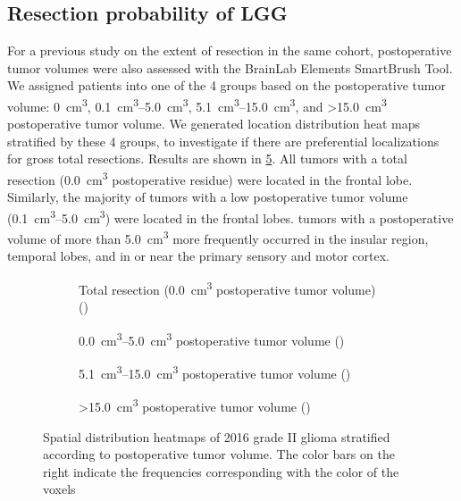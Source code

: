 \subsection{Resection probability of \acrshort{LGG}}
For a previous study on the extent of resection in the same cohort, postoperative \gls{tumor} volumes were also assessed with the BrainLab Elements SmartBrush Tool.
We assigned patients into one of the 4 groups based on the postoperative \gls{tumor} volume:  \SI{0}{\cubic\centi\metre}, \SIrange{0.1}{5.0}{\cubic\centi\metre}, \SIrange{5.1}{15.0}{\cubic\centi\metre}, and \SI{>15.0}{\cubic\centi\metre} postoperative \gls{tumor} volume.
We generated location distribution heat maps stratified by these 4 groups, to investigate if there are preferential localizations for gross total resections.
Results are shown in \cref{fig:LGG_location_postop_volume}.
All \glspl{tumor} with a total resection (\SI{0.0}{\cubic\centi\metre} postoperative residue) were located in the frontal lobe.
Similarly, the majority of \glspl{tumor} with a low postoperative \gls{tumor} volume (\SIrange{0.1}{5.0}{\cubic\centi\metre}) were located in the frontal lobes.
\Glspl{tumor} with a postoperative volume of more than \SI{5.0}{\cubic\centi\metre} more frequently occurred in the insular region, temporal lobes, and in or near the primary sensory and motor cortex.

\begin{figure}[htbp]
\centering
\begin{subfigure}[b]{\textwidth}
    \caption{Total resection (\SI{0.0}{\cubic\centi\metre} postoperative \gls{tumor} volume) ()}\label{fig:LGG_location_heatmap_postop_0}
\end{subfigure}
\begin{subfigure}[b]{\textwidth}
    \caption{\SIrange{0.0}{5.0}{\cubic\centi\metre} postoperative \gls{tumor} volume ()}\label{fig:LGG_location_heatmap_postop_01_50}
\end{subfigure}
\begin{subfigure}[b]{\textwidth}
    \caption{\SIrange{5.1}{15.0}{\cubic\centi\metre} postoperative \gls{tumor} volume ()}\label{fig:LGG_location_heatmap_postop_51_150}
\end{subfigure}
\begin{subfigure}[b]{\textwidth}
    \caption{\SI{>15.0}{\cubic\centi\metre} postoperative \gls{tumor} volume ()}\label{fig:LGG_location_heatmap_postop_150}
\end{subfigure}
\caption{Spatial distribution heatmaps of  2016 grade II glioma stratified according to postoperative \gls{tumor} volume.
 The color bars on the right indicate the frequencies corresponding with the color of the voxels}\label{fig:LGG_location_postop_volume}
\end{figure}

